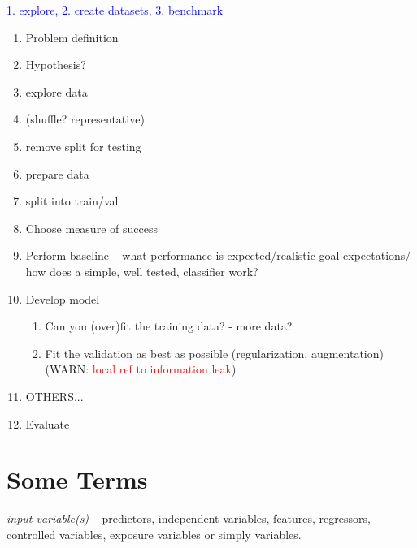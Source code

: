 \textcolor{blue}{1. explore, 2. create datasets, 3. benchmark}
\begin{enumerate}
	\item Problem definition
	\item Hypothesis?
	\item explore data
	\item (shuffle? representative)
	\item remove split for testing
	\item prepare data
	\item split into train/val
	\item Choose measure of success
	\item Perform baseline -- what performance is expected/realistic goal expectations/ how does a simple, well tested, classifier work?
	\item Develop model
	\begin{enumerate}
		\item Can you (over)fit the training data? - more data?
		\item Fit the validation as best as possible (regularization, augmentation) (WARN: \textcolor{red}{local ref to information leak})
	\end{enumerate}
	\item OTHERS...
	\item Evaluate
\end{enumerate}














\section{Some Terms}

\emph{input variable(s)} -- predictors, independent variables, features, regressors, controlled variables, exposure variables or simply variables.
 
